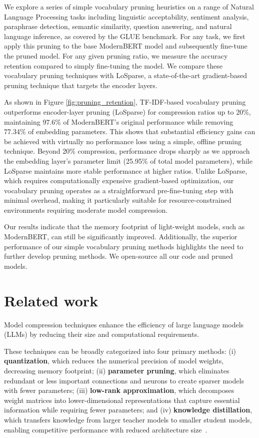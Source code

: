 \documentclass[twocolumn]{article}
\begin{document}
We explore a series of simple vocabulary pruning heuristics on a range of Natural Language Processing tasks including linguistic acceptability, sentiment analysis, paraphrase detection, semantic similarity, question answering, and natural language inference, as covered by the GLUE benchmark. For any task, we first apply this pruning to the base ModernBERT model and subsequently fine-tune the pruned model. For any given pruning ratio, we measure the accuracy retention compared to simply fine-tuning the model. We compare these vocabulary pruning techniques with LoSparse, a state-of-the-art gradient-based pruning technique that targets the encoder layers.

As shown in Figure \ref{fig:pruning_retention}, TF-IDF-based vocabulary pruning outperforms encoder-layer pruning (LoSparse) for compression ratios up to 20\%, maintaining 97.6\% of ModernBERT's original performance while removing 77.34\% of embedding parameters. This shows that substantial efficiency gains can be achieved with virtually no performance loss using a simple, offline pruning technique. Beyond 20\% compression, performance drops sharply as we approach the embedding layer's parameter limit (25.95\% of total model parameters), while LoSparse maintains more stable performance at higher ratios. Unlike LoSparse, which requires computationally expensive gradient-based optimization, our vocabulary pruning operates as a straightforward pre-fine-tuning step with minimal overhead, making it particularly suitable for resource-constrained environments requiring moderate model compression.

Our results indicate that the memory footprint of light-weight models, such as ModernBERT, can still be significantly improved. Additionally, the superior performance of our simple vocabulary pruning methods highlights the need to further develop pruning methods. We open-source all our code and pruned models.

\section{Related work}
Model compression techniques enhance the efficiency of large language models (LLMs) by reducing their size and computational requirements.

These techniques can be broadly categorized into four primary methods:
(i) \textbf{quantization}, which reduces the numerical precision of model weights, decreasing memory footprint;
(ii) \textbf{parameter pruning}, which eliminates redundant or less important connections and neurons to create sparser models with fewer parameters;
(iii) \textbf{low-rank approximation}, which decomposes weight matrices into lower-dimensional representations that capture essential information while requiring fewer parameters; and
(iv) \textbf{knowledge distillation}, which transfers knowledge from larger teacher models to smaller student models, enabling competitive performance with reduced architecture size~\cite{wan2023efficient}.
\end{document}
